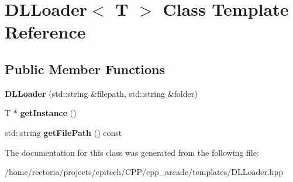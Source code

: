 \hypertarget{class_d_l_loader}{}\section{D\+L\+Loader$<$ T $>$ Class Template Reference}
\label{class_d_l_loader}
\subsection*{Public Member Functions}
\begin{DoxyCompactItemize}
\item 
\mbox{\label{class_d_l_loader_af0a34ff238f941a6d68332fd7c42550b}} 
{\bfseries D\+L\+Loader} (std\+::string \&filepath, std\+::string \&folder)
\item 
\mbox{\label{class_d_l_loader_a3992a18f851ef44576103087a3bb452c}} 
T $\ast$ {\bfseries get\+Instance} ()
\item 
\mbox{\label{class_d_l_loader_a333beb7a6e8d61a1a566acf8be00c0d8}} 
std\+::string {\bfseries get\+File\+Path} () const
\end{DoxyCompactItemize}


The documentation for this class was generated from the following file\+:\begin{DoxyCompactItemize}
\item 
/home/rectoria/projects/epitech/\+C\+P\+P/cpp\+\_\+arcade/templates/D\+L\+Loader.\+hpp\end{DoxyCompactItemize}
